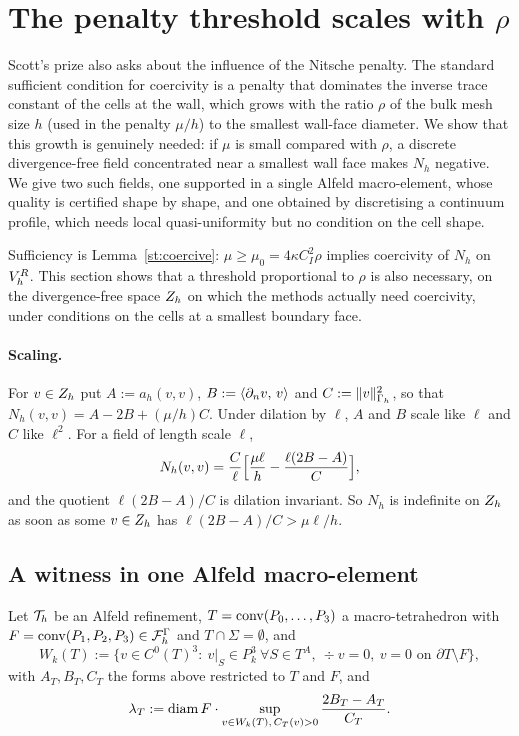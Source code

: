 \section{The penalty threshold scales with \texorpdfstring{$\rho$}{rho}}\label{sec:penalty}

Scott's prize also asks about the influence of the Nitsche penalty. The standard sufficient condition for coercivity is a penalty that dominates the inverse trace constant of the cells at the wall, which grows with the ratio $\rho$ of the bulk mesh size $h$ (used in the penalty $\mu/h$) to the smallest wall-face diameter. We show that this growth is genuinely needed: if $\mu$ is small compared with $\rho$, a discrete divergence-free field concentrated near a smallest wall face makes $N_h$ negative. We give two such fields, one supported in a single Alfeld macro-element, whose quality is certified shape by shape, and one obtained by discretising a continuum profile, which needs local quasi-uniformity but no condition on the cell shape.

Sufficiency is Lemma~\ref{st:coercive}: $\mu\ge\mu_0=4\kappa C_I^2\rho$ implies coercivity of $N_h$ on $V_h^R$. This section shows that a threshold proportional to $\rho$ is also necessary, on the divergence-free space $Z_h$ on which the methods actually need coercivity, under conditions on the cells at a smallest boundary face.

\paragraph{Scaling.} For $v\in Z_h$ put $A:=a_h(v,v)$, $B:=\langle \partial_n v,\, v\rangle$ and $C:=\lVert v\rVert^2_{\Gamma_h}$, so that $N_h(v,v)=A-2B+(\mu/h)C$. Under dilation by $\ell$, $A$ and $B$ scale like $\ell$ and $C$ like $\ell^2$. For a field of length scale $\ell$,
\begin{equation}\label{pen:scale}
N_h(v,v)=\frac C\ell\Bigl[\frac{\mu\ell}h-\frac{\ell(2B-A)}C\Bigr],
\end{equation}
and the quotient $\ell(2B-A)/C$ is dilation invariant. So $N_h$ is indefinite on $Z_h$ as soon as some $v\in Z_h$ has $\ell(2B-A)/C>\mu\ell/h$.

\subsection{A witness in one Alfeld macro-element}
Let $\mathcal T_h$ be an Alfeld refinement, $T=\operatorname{conv}(P_0,\dots,P_3)$ a macro-tetrahedron with $F=\operatorname{conv}(P_1,P_2,P_3)\in\mathcal F_h^\Gamma$ and $T\cap\Sigma=\emptyset$, and
\[
W_k(T):=\bigl\{v\in C^0(T)^3:\ v|_S\in P_k^3\ \forall S\in T^A,\ \div v=0,\ v=0\text{ on }\partial T\setminus F\bigr\},
\]
with $A_T,B_T,C_T$ the forms above restricted to $T$ and $F$, and
\[
\lambda_T:=\operatorname{diam} F\cdot\sup_{v\in W_k(T),\,C_T(v)>0}\frac{2B_T-A_T}{C_T}.
\]

